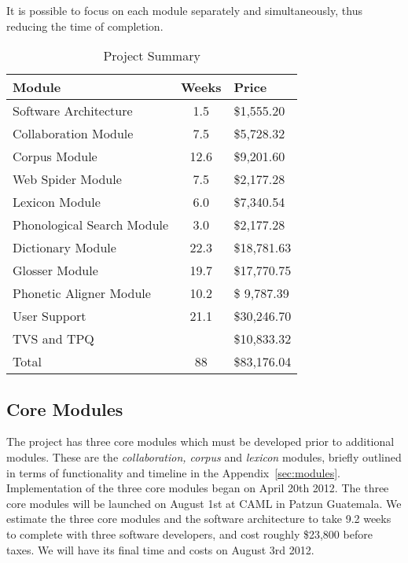 \documentclass[12pt]{article}
\begin{document}
It is possible to focus on each module separately and simultaneously, thus reducing the time of completion. 



\begin{table}[htbp]
\begin{center}
  \begin{tabular}{ | lcl | }
\hline
    Module & Weeks & Price\\ 
\hline
    Software Architecture & 1.5  & \$1,555.20  \\ 
    Collaboration Module & 7.5  & \$5,728.32  \\ 
    Corpus Module & 12.6 & \$9,201.60 \\
     Web Spider Module  & 7.5 & \$2,177.28\\
      Lexicon Module & 6.0 & \$7,340.54 \\ 
     Phonological Search Module & 3.0 & \$2,177.28 \\
    Dictionary Module & 22.3 & \$18,781.63 \\
        Glosser Module & 19.7 & \$17,770.75 \\
Phonetic Aligner Module & 10.2 & \$ 9,787.39\\ 
User Support & 21.1 & \$30,246.70 \\
TVS and TPQ &  & \$10,833.32 \\
Total &  88 &\$83,176.04\\

\hline
  \end{tabular}
  \caption{Project Summary}
  \label{tab:label}
  \end{center}
\end{table}


\subsection{Core Modules}

The project has three core modules which must be developed prior to additional modules. These are the {\it collaboration, corpus} and {\it lexicon} modules, briefly outlined in terms of functionality and timeline in the Appendix~\ref{sec:modules}.  Implementation of the three core modules began on April 20th 2012. The three core modules will be launched on August 1st at CAML in Patzun Guatemala. We estimate the three core modules and the software architecture to take 9.2 weeks to complete with three software developers,  and cost roughly \$23,800 before taxes. We will have its final time and costs on August 3rd 2012.
\end{document}
